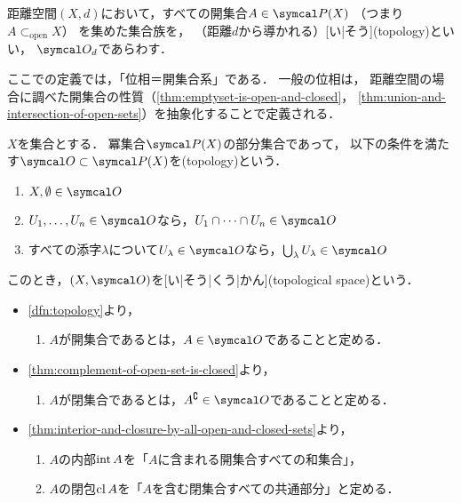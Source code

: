 \documentclass[../sotsu.tex]{subfiles}
\begin{document}
\begin{definition}[距離位相]
    \label{dfn:topology-by-distance}
    距離空間$(X, d)$において，すべての開集合$A \in \pset(X)$
    （つまり$A \subset_{\text{open}} X$）
    を集めた集合族を，
    （距離$d$から導かれる）[い|そう](topology)といい，
    $\topology_d$であらわす．
\end{definition}

ここでの定義では，「位相＝開集合系」である．
一般の位相は，
距離空間の場合に調べた開集合の性質（\cref{thm:emptyset-is-open-and-closed}，
\cref{thm:union-and-intersection-of-open-sets}）を抽象化することで定義される．

\begin{definition}[位相]
    \label{dfn:topology}
    $X$を集合とする．
    冪集合$\pset(X)$の部分集合であって，
    以下の条件を満たす$\topology \subset \pset(X)$を(topology)という．
    \begin{enumerate}
        \item $X, \emptyset \in \topology$
        \item $U_1, \dots, U_n \in \topology$なら，$U_1 \cap \dots \cap U_n \in \topology$
        \item すべての添字$\lambda$について$U_\lambda \in \topology$なら，$\bigcup_{\lambda} U_\lambda \in \topology$
    \end{enumerate}
    このとき，$(X, \topology)$を[い|そう|くう|かん](topological space)という．
\end{definition}


\begin{itemize}
    \item \cref{dfn:topology}より，
    \begin{enumerate}
        \item $A$が開集合であるとは，$A \in \topology$であることと定める．
    \end{enumerate}

    \item \cref{thm:complement-of-open-set-is-closed}より，
    \begin{enumerate}[resume]
        \item $A$が閉集合であるとは，$A^\complement \in \topology$であることと定める．
    \end{enumerate}

    \item \cref{thm:interior-and-closure-by-all-open-and-closed-sets}より，
    \begin{enumerate}[resume]
        \item $A$の内部$\operatorname{int}{A}$を「$A$に含まれる開集合すべての和集合」，
        \item $A$の閉包$\operatorname{cl}{A}$を「$A$を含む閉集合すべての共通部分」と定める．
    \end{enumerate}
\end{itemize}
\end{document}
